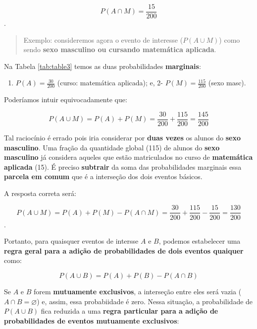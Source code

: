 \documentclass[
]{book}
\providecommand{\tightlist}{%
  \setlength{\itemsep}{0pt}\setlength{\parskip}{0pt}}
\begin{document}
\hfill\break

\[
P(A \cap M) = \frac{15}{200}
\].

\hfill\break

\begin{quote}
Exemplo: consideremos agora o evento de interesse (\(P(A \cup M)\)) como sendo \textbf{sexo masculino ou cursando matemática aplicada}.
\end{quote}

\hfill\break

Na Tabela \ref{tab:table3} temos as duas probabilidades \textbf{marginais}:

\hfill\break

\begin{enumerate}
\def\labelenumi{\arabic{enumi}.}
\tightlist
\item
  \(P(A)=\frac{30}{200}\) (curso: matemática aplicada); e,
  2- \(P(M)=\frac{115}{200}\) (sexo masc).
\end{enumerate}

\hfill\break

Poderíamos intuir equivocadamente que:

\hfill\break

\[
P(A \cup M) = P(A) + P(M) = \frac{30}{200} + \frac{115}{200} = \frac{145}{200}
\]

\hfill\break

Tal raciocínio é errado pois iria considerar por \textbf{duas vezes} os alunos do \textbf{sexo masculino}. Uma fração da quantidade global (115) de alunos do \textbf{sexo masculino} já considera aqueles que estão matriculados no curso de \textbf{matemática aplicada} (15). É preciso \textbf{subtrair} da soma das probabilidades marginais essa \textbf{parcela em comum} que é a interseção dos dois eventos básicos.

A resposta correta será:

\[
P(A \cup M) = P(A) + P(M) - P(A \cap M) = \frac{30}{200} + \frac{115}{200} -\frac{15}{200} = \frac{130}{200}
\].

\hfill\break

Portanto, para quaisquer eventos de intersse \(A\) e \(B\), podemos estabelecer uma \textbf{regra geral para a adição de probabilidades de dois eventos quaiquer} como:

\hfill\break

\[
P(A \cup B) = P(A) + P(B) - P(A \cap B)
\]

\hfill\break

Se \(A\) e \(B\) forem \textbf{mutuamente exclusivos}, a interseção entre eles será vazia (\(A \cap B =\varnothing\)) e, assim, essa probabiidade é zero. Nessa situação, a probabilidade de \(P(A \cup B)\) fica reduzida a uma \textbf{regra particular para a adição de probabilidades de eventos mutuamente exclusivos}:
\end{document}
